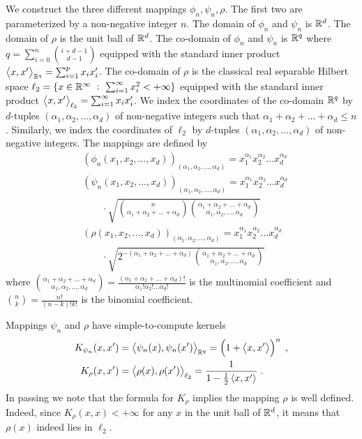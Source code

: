 We construct the three different mappings $\phi_n, \psi_n, \rho$. The first two
are parameterized by a non-negative integer $n$. The domain of $\phi_n$ and
$\psi_n$ is $\mathbb{R}^d$. The domain of $\rho$ is the unit ball of $\mathbb{R}^d$. The
co-domain of $\phi_n$ and $\psi_n$ is $\mathbb{R}^q$ where $q = \sum_{i=0}^n
\binom{i+d-1}{d-1}$ equipped with the standard inner product $\left\langle x, x' \right\rangle_{\mathbb{R}^q} =
\sum_{i=1}^p x_i x'_i$. The co-domain of $\rho$ is the classical real separable Hilbert space
$\ell_2 = \{ x \in \mathbb{R}^\infty ~:~ \sum_{i=1}^\infty x_i^2 < + \infty \}$ equipped
with the standard inner product $\left\langle x, x' \right\rangle_{\ell_2} = \sum_{i=1}^\infty x_i x'_i$. We
index the coordinates of the co-domain $\mathbb{R}^q$ by $d$-tuples $(\alpha_1,
\alpha_2, \dots, \alpha_d)$ of non-negative integers such that $\alpha_1 +
\alpha_2 + \dots + \alpha_d \le n$. Similarly, we index the coordinates of
$\ell_2$ by $d$-tuples $(\alpha_1, \alpha_2, \dots, \alpha_d)$ of non-negative
integers. The mappings are defined by
\begin{align*}
& \left(\phi_n(x_1, x_2, \dots, x_d)\right)_{(\alpha_1, \alpha_2, \dots, \alpha_d)}
= x_1^{\alpha_1} x_2^{\alpha_2} \dots x_d^{\alpha_d}
\\
& \left(\psi_n(x_1, x_2, \dots, x_d)\right)_{(\alpha_1, \alpha_2, \dots, \alpha_d)} = x_1^{\alpha_1} x_2^{\alpha_2} \dots x_d^{\alpha_d} \\
& \qquad \cdot \sqrt{\binom{n}{\alpha_1 + \alpha_2 + \dots + \alpha_d} \binom{\alpha_1 + \alpha_2 + \dots + \alpha_d}{\alpha_1, \alpha_2, \dots, \alpha_d}}
\\
& \left(\rho(x_1, x_2, \dots, x_d)\right)_{(\alpha_1, \alpha_2, \dots, \alpha_d)} = x_1^{\alpha_1} x_2^{\alpha_2} \dots x_d^{\alpha_d} \\
& \qquad \cdot \sqrt{2^{-(\alpha_1 + \alpha_2 + \dots + \alpha_d)} \binom{\alpha_1 + \alpha_2 + \dots + \alpha_d}{\alpha_1, \alpha_2, \dots, \alpha_d}}
\end{align*}
where $\binom{\alpha_1 + \alpha_2 + \dots + \alpha_d}{\alpha_1, \alpha_2, \dots, \alpha_d} = \frac{(\alpha_1 + \alpha_2 + \dots + \alpha_d)!}{\alpha_1! \alpha_2! \dots \alpha_d!}$
is the multinomial coefficient and $\binom{n}{k} = \frac{n!}{(n-k)!k!}$ is the binomial coefficient.

Mappings $\psi_n$ and $\rho$ have simple-to-compute kernels
\begin{align*}
K_{\psi_n}(x,x') & = \left\langle \psi_n(x), \psi_n(x') \right\rangle_{\mathbb{R}^q} = \left( 1 + \left\langle x, x' \right\rangle \right)^n \; , \\
K_{\rho}(x,x') & = \left\langle \rho(x), \rho(x') \right\rangle_{\ell_2} = \frac{1}{1 - \frac{1}{2}\left\langle x, x' \right\rangle} \; .
\end{align*}
In passing we note that the formula for $K_\rho$ implies the mapping $\rho$ is
well defined. Indeed, since $K_{\rho}(x,x) < +\infty$ for any $x$ in the unit
ball of $\mathbb{R}^d$, it means that $\rho(x)$ indeed lies in $\ell_2$.

